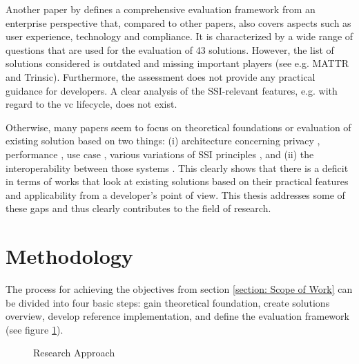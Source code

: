	Another paper by \cite{kuperberg_blockchain-based_2020} defines a comprehensive evaluation framework from an enterprise perspective that, compared to other papers, also covers aspects such as user experience, technology and compliance. It is characterized by a wide range of questions that are used for the evaluation of 43 solutions. However, the list of solutions considered is outdated and missing important players (see e.g. MATTR and Trinsic). Furthermore, the assessment does not provide any practical guidance for developers. A clear analysis of the SSI-relevant features, e.g. with regard to the \ac{vc} lifecycle, does not exist. 
	
	Otherwise, many papers seem to focus on theoretical foundations or evaluation of existing solution based on two things: (i) architecture \cite{gruner_relevance_2018} concerning privacy \cite{bernabe_privacy-preserving_2019}, performance \cite{bouras_distributed_2020}, use case \cite{kuperberg_blockchain-based_2020}, various variations \cite{allen_path_2016, sporny_decentralized_2021, allende_lopez_self-sovereign_2020, bouras_distributed_2020, ferdous_search_2019, cameron_laws_2005} of \ac{SSI} principles \cite{van_bokkem_self-sovereign_2019, bouras_distributed_2020, dib_decentralized_2020, dunphy_first_2018, ferdous_search_2019, friedewald_self-sovereign_2020}, and (ii) the interoperability between those systems \cite{homeland_security_preventing_2020, john_dhs_2020}. This clearly shows that there is a deficit in terms of works that look at existing solutions based on their practical features and applicability from a developer's point of view. This thesis addresses some of these gaps and thus clearly contributes to the field of research.
	
	\section{Methodology} %
    The process for achieving the objectives from section \ref{section: Scope of Work} can be divided into four basic steps: gain theoretical foundation, create solutions overview, develop reference implementation, and define the evaluation framework (see figure \ref{figure: approach}).
    
    \begin{figure}[ht]
	    \centering
        \caption{Research Approach}
        \label{figure: approach}
    \end{figure}
	
